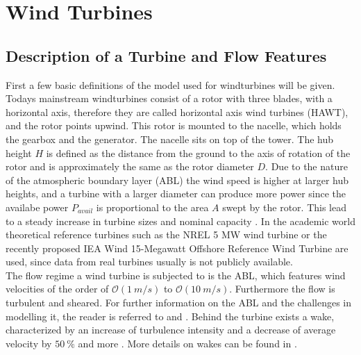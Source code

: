\section{Wind Turbines}
\subsection{Description of a Turbine and Flow Features}
First a few basic definitions of the model used for windturbines will be given. Todays mainstream windturbines consist of a rotor with three blades, with a horizontal axis, therefore they are called horizontal axis wind turbines (HAWT), and the rotor points upwind.  This rotor is mounted to the nacelle, which holds the gearbox and the generator. The nacelle sits on top of the tower. The hub height $H$ is defined as the distance from the ground to the axis of rotation of the rotor and is approximately the same as the rotor diameter $D$. Due to the nature of the atmospheric boundary layer (ABL) the wind speed is higher at larger hub heights, and a turbine with a larger diameter can produce more power since the availabe power $P_{avail}$ is proportional to the area $A$ swept by the rotor. This lead to a steady increase in turbine sizes and nominal capacity \cite{rohrig_powering_2019}. In the academic world theoretical reference turbines such as the NREL 5 MW wind turbine \cite{jonkman_definition_2009} or the recently proposed IEA Wind 15-Megawatt Offshore Reference Wind Turbine \cite{gaertner_iea_2020} are used, since data from real turbines usually is not publicly available.\cite{hansen_aerodynamics_2008} \\
The flow regime a wind turbine is subjected to is the ABL, which features wind velocities of the order of $\mathcal{O}(\SI{1}{m/s})$ to $\mathcal{O}(\SI{10}{m/s})$. Furthermore the flow is turbulent and sheared. For further information on the ABL and the challenges in modelling it, the reader is referred to \cite{kaimal_atmospheric_1994} and \cite{holtslag_stable_2013}. Behind the turbine exists a wake, characterized by an increase of turbulence intensity and a decrease of average velocity by $\SI{50}{\percent}$ and more \cite{abkar_wake_2016-1}. More details on wakes can be found in \cite{boersma_tutorial_2017}.

